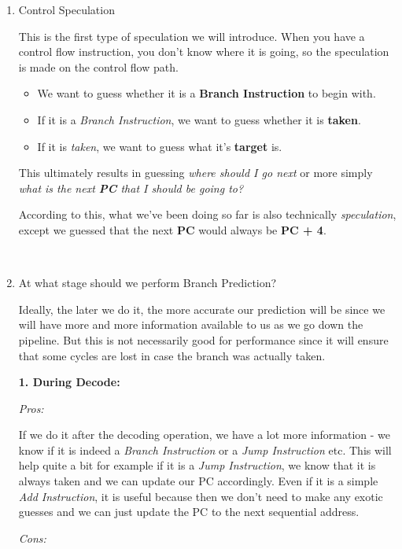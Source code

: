 \documentclass[12pt]{article}
\newenvironment{QandA}{\begin{enumerate}[label=\bfseries\arabic*.]\bfseries}
                      {\end{enumerate}}
\newenvironment{answered}{\par\quad\normalfont}{}
\begin{document}
\begin{QandA}
\ 

\item Control Speculation
\begin{answered}
    This is the first type of speculation we will introduce. When you have a control flow instruction, you don't know where it is going, so the speculation is made on the control flow path. 
    \begin{itemize}
        \item We want to guess whether it is a \textbf{Branch Instruction} to begin with.
        \item If it is a \textit{Branch Instruction}, we want to guess whether it is \textbf{taken}.
        \item If it is \textit{taken}, we want to guess what it's \textbf{target} is.
    \end{itemize}
    This ultimately results in guessing \textit{where should I go next} or more simply \textit{what is the next \textbf{PC} that I should be going to?}
    
    According to this, what we've been doing so far is also technically \textit{speculation}, except we guessed that the next \textbf{PC} would always be \textbf{PC + 4}.
\end{answered}

\ 

\item At what stage should we perform Branch Prediction?
\begin{answered}
    Ideally, the later we do it, the more accurate our prediction will be since we will have more and more information available to us as we go down the pipeline. But this is not necessarily good for performance since it will ensure that some cycles are lost in case the branch was actually taken.
    
    \textbf{1. During Decode:}
    
    \textit{Pros:}
    
    If we do it after the decoding operation, we have a lot more information - we know if it is indeed a \textit{Branch Instruction} or a \textit{Jump Instruction} etc. This will help quite a bit for example if it is a \textit{Jump Instruction}, we know that it is always taken and we can update our PC accordingly. Even if it is a simple \textit{Add Instruction}, it is useful because then we don't need to make any exotic guesses and we can just update the PC to the next sequential address. 
    
    \textit{Cons:}
    

\end{answered}
\end{QandA}
\end{document}
